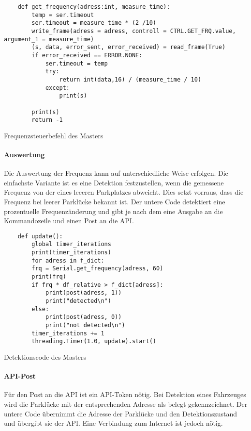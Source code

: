\begin{listing}[H]
    \begin{verbatim}
    def get_frequency(adress:int, measure_time):
        temp = ser.timeout
        ser.timeout = measure_time * (2 /10)
        write_frame(adress = adress, controll = CTRL.GET_FRQ.value, argument_1 = measure_time)
        (s, data, error_sent, error_received) = read_frame(True)
        if error_received == ERROR.NONE:
            ser.timeout = temp
            try:
                return int(data,16) / (measure_time / 10)
            except:
                print(s)

        print(s)
        return -1
    \end{verbatim}
    \caption{Frequenzsteuerbefehl des Masters}
\end{listing}
\paragraph{Auswertung}\mbox{} 

Die Auswertung der Frequenz kann auf unterschiedliche Weise erfolgen. Die einfachste Variante ist es eine Detektion festzustellen, wenn die gemessene Frequenz von der eines leeeren Parkplatzes abweicht. Dies setzt vorraus, dass die Frequenz bei leerer 
Parklücke bekannt ist. Der untere Code detektiert eine prozentuelle Frequenzänderung und gibt je nach dem eine Ausgabe an die Kommandozeile und einen Post an die API.

\begin{listing}[H]
    \begin{verbatim}
    def update():
        global timer_iterations
        print(timer_iterations)
        for adress in f_dict:
        frq = Serial.get_frequency(adress, 60)
        print(frq)
        if frq * df_relative > f_dict[adress]:
            print(post(adress, 1))
            print("detected\n")
        else:
            print(post(adress, 0))
            print("not detected\n")
        timer_iterations += 1
        threading.Timer(1.0, update).start()
    \end{verbatim}
    \caption{Detektionscode des Masters}
\end{listing}


\paragraph{API-Post}\mbox{}

Für den Post an die API ist ein API-Token nötig. Bei Detektion eines Fahrzeuges wird die Parklücke mit der entsprechenden Adresse als belegt gekennzeichnet. Der untere Code übernimmt die Adresse der Parklücke und den Detektionszustand und übergibt sie der API.
Eine Verbindung zum Internet ist jedoch nötig.

